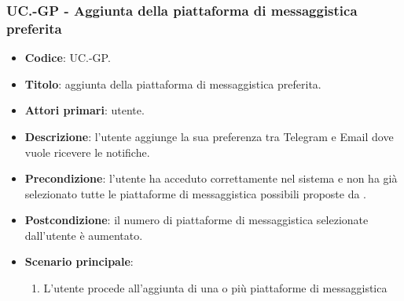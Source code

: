 	\subsubsection{UC\theuccount.\thesubuccount-GP - Aggiunta della piattaforma di messaggistica preferita}

		\begin{itemize}
			\item \textbf{Codice}: UC\theuccount.\thesubuccount-GP.
			\item \textbf{Titolo}: aggiunta della piattaforma di messaggistica preferita.
			\item \textbf{Attori primari}: utente.
			\item \textbf{Descrizione}: l’utente aggiunge la sua preferenza tra Telegram e Email dove vuole ricevere le notifiche.
			\item \textbf{Precondizione}: l’utente ha acceduto correttamente nel sistema e non ha già selezionato tutte le piattaforme di messaggistica possibili proposte da \progetto.
			\item \textbf{Postcondizione}: il numero di piattaforme di messaggistica selezionate dall’utente è aumentato.
			\item \textbf{Scenario principale}:
			\begin{enumerate}
				\item L'utente procede all'aggiunta di una o più piattaforme di messaggistica
			\end{enumerate}
		\end{itemize}


